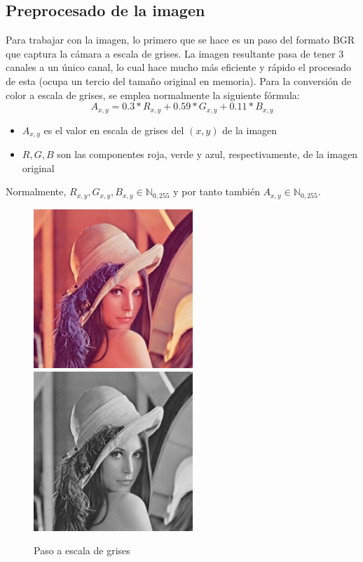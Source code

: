 \subsection{Preprocesado de la imagen}
Para trabajar con la imagen, lo primero que se hace es un paso del formato BGR que captura la cámara a escala de grises. La imagen resultante pasa de tener 3 canales a un único canal, lo cual hace mucho más eficiente y rápido el procesado de esta (ocupa un tercio del tamaño original en memoria). Para la conversión de color a escala de grises, se emplea normalmente la siguiente fórmula\cite{RGB2grayscale}:
\[
	A_{x,y}= 0.3 * R_{x,y} + 0.59 * G_{x,y} + 0.11 * B_{x,y}
\]
\begin{itemize}
	\item{$A_{x,y}$ es el valor en escala de grises del $(x,y)$ de la imagen }
	\item{$R, G, B$ son las componentes roja, verde y azul, respectivamente, de la imagen original}
\end{itemize}
Normalmente, $R_{x,y}, G_{x,y}, B_{x,y} \in \mathbb{N}_{0,255}$ y por tanto también $A_{x,y} \in \mathbb{N}_{0,255}$.

\begin{figure}[h!]
	\centering
	\includegraphics[height=6cm]{imagenes/lena_color_256.jpg}
	\includegraphics[height=6cm]{imagenes/lena_gray_256.jpg}
	\caption{Paso a escala de grises}
	\label{fig:grayscale_conversion}
\end{figure}

